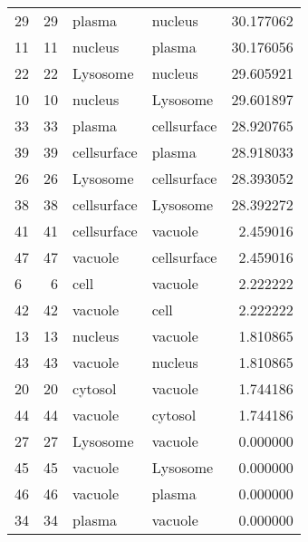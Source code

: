 \begin{tabular}{lrllr}
29 &          29 &          plasma &          nucleus &  30.177062 \\
11 &          11 &         nucleus &           plasma &  30.176056 \\
22 &          22 &        Lysosome &          nucleus &  29.605921 \\
10 &          10 &         nucleus &         Lysosome &  29.601897 \\
33 &          33 &          plasma &      cellsurface &  28.920765 \\
39 &          39 &     cellsurface &           plasma &  28.918033 \\
26 &          26 &        Lysosome &      cellsurface &  28.393052 \\
38 &          38 &     cellsurface &         Lysosome &  28.392272 \\
41 &          41 &     cellsurface &          vacuole &   2.459016 \\
47 &          47 &         vacuole &      cellsurface &   2.459016 \\
6  &           6 &            cell &          vacuole &   2.222222 \\
42 &          42 &         vacuole &             cell &   2.222222 \\
13 &          13 &         nucleus &          vacuole &   1.810865 \\
43 &          43 &         vacuole &          nucleus &   1.810865 \\
20 &          20 &         cytosol &          vacuole &   1.744186 \\
44 &          44 &         vacuole &          cytosol &   1.744186 \\
27 &          27 &        Lysosome &          vacuole &   0.000000 \\
45 &          45 &         vacuole &         Lysosome &   0.000000 \\
46 &          46 &         vacuole &           plasma &   0.000000 \\
34 &          34 &          plasma &          vacuole &   0.000000 \\
\bottomrule
\end{tabular}
